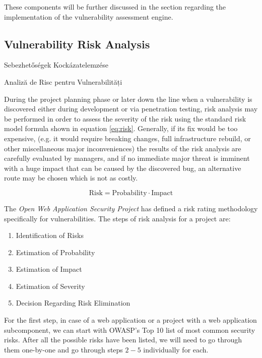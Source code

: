\documentclass[a4paper,12pt]{article}
\newcommand\subsectionhu[1]{\addcontentsline{toc.hu}{subsection} {\protect\numberline{\thesubsection} #1}}
\newcommand\subsectionro[1]{\addcontentsline{toc.ro}{subsection} {\protect\numberline{\thesubsection} #1}}
\begin{document}
	These components will be further discussed in the section regarding the implementation of the vulnerability assessment engine.
	
\subsection{Vulnerability Risk Analysis} \label{ssec:vulnriskanal}
\subsectionhu{Sebezhetőségek Kockázatelemzése} \subsectionro{Analiză de Risc pentru Vulnerabilități}

	During the project planning phase or later down the line when a vulnerability is discovered either during development or via penetration testing, risk analysis may be performed in order to assess the severity of the risk using the standard risk model formula shown in equation \ref{eq:risk}. Generally, if its fix would be too expensive, (e.g. it would require breaking changes, full infrastructure rebuild, or other miscellaneous major inconveniences) the results of the risk analysis are carefully evaluated by managers, and if no immediate major threat is imminent with a huge impact that can be caused by the discovered bug, an alternative route may be chosen which is not as costly.
	
	\begin{equation} \label{eq:risk}
		\textrm{Risk} = \textrm{Probability} \cdot \textrm{Impact}
	\end{equation}
	
	The \textit{Open Web Application Security Project} has defined a risk rating methodology\cite{owasp4} specifically for vulnerabilities. The steps of risk analysis for a project are:
	
	\begin{enumerate}
	  \item Identification of Risks
	  \item Estimation of Probability
	  \item Estimation of Impact
	  \item Estimation of Severity
	  \item Decision Regarding Risk Elimination
	\end{enumerate}
	
	For the first step, in case of a web application or a project with a web application subcomponent, we can start with OWASP's Top 10\cite{owasp10} list of most common security risks. After all the possible risks have been listed, we will need to go through them one-by-one and go through steps $2-5$ individually for each.
	
\end{document}
